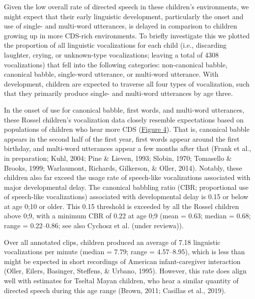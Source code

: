 \documentclass[,man,mask,floatsintext]{apa6}
\begin{document}
Given the low overall rate of directed speech in these children's
environments, we might expect that their early linguistic development,
particularly the onset and use of single- and multi-word utterances, is
delayed in comparison to children growing up in more CDS-rich
environments. To briefly investigate this we plotted the proportion of
all linguistic vocalizations for each child (i.e., discarding laughter,
crying, or unknown-type vocalizations; leaving a total of 4308
vocalizations) that fell into the following categories: non-canonical
babble, canonical babble, single-word utterance, or multi-word
utterance. With development, children are expected to traverse all four
types of vocalization, such that they primarily produce single- and
multi-word utterances by age three.

In the onset of use for canonical babble, first words, and multi-word
utterances, these Rossel children's vocalization data closely resemble
expectations based on populations of children who hear more CDS
(\protect\hyperlink{fig4}{Figure 4}). That is, canonical babble appears
in the second half of the first year, first words appear around the
first birthday, and multi-word utterances appear a few months after that
(Frank et al., in preparation; Kuhl, 2004; Pine \& Lieven, 1993; Slobin,
1970; Tomasello \& Brooks, 1999; Warlaumont, Richards, Gilkerson, \&
Oller, 2014). Notably, these children also far exceed the usage rate of
speech-like vocalizations associated with major developmental delay. The
canonical babbling ratio (CBR; proportional use of speech-like
vocalizations) associated with developmental delay is 0.15 or below at
age 0;10 or older. This 0.15 threshold is exceeded by all the Rossel
children above 0;9, with a minimum CBR of 0.22 at age 0;9 (mean = 0.63;
median = 0.68; range = 0.22--0.86; see also Cychosz et al. (under
reviewa)).

Over all annotated clips, children produced an average of 7.18
linguistic vocalizations per minute (median = 7.79; range = 4.57--8.95),
which is less than might be expected in short recordings of American
infant-caregiver interaction (Oller, Eilers, Basinger, Steffens, \&
Urbano, 1995). However, this rate does align well with estimates for
Tseltal Mayan children, who hear a similar quantity of directed speech
during this age range (Brown, 2011; Casillas et al., 2019).
\end{document}
